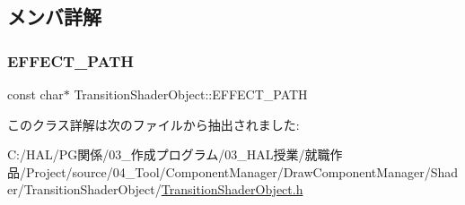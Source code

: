 \subsection{メンバ詳解}
\mbox{\label{class_transition_shader_object_a1ef65490b6ef22b643ed47c74caf695e}} 
\subsubsection{\texorpdfstring{E\+F\+F\+E\+C\+T\+\_\+\+P\+A\+TH}{EFFECT\_PATH}}
{\footnotesize\ttfamily const char$\ast$ Transition\+Shader\+Object\+::\+E\+F\+F\+E\+C\+T\+\_\+\+P\+A\+TH\hspace{0.3cm}{\ttfamily [static]}}



このクラス詳解は次のファイルから抽出されました\+:\begin{DoxyCompactItemize}
\item 
C\+:/\+H\+A\+L/\+P\+G関係/03\+\_\+作成プログラム/03\+\_\+\+H\+A\+L授業/就職作品/\+Project/source/04\+\_\+\+Tool/\+Component\+Manager/\+Draw\+Component\+Manager/\+Shader/\+Transition\+Shader\+Object/\mbox{\hyperlink{_transition_shader_object_8h}{Transition\+Shader\+Object.\+h}}\end{DoxyCompactItemize}

